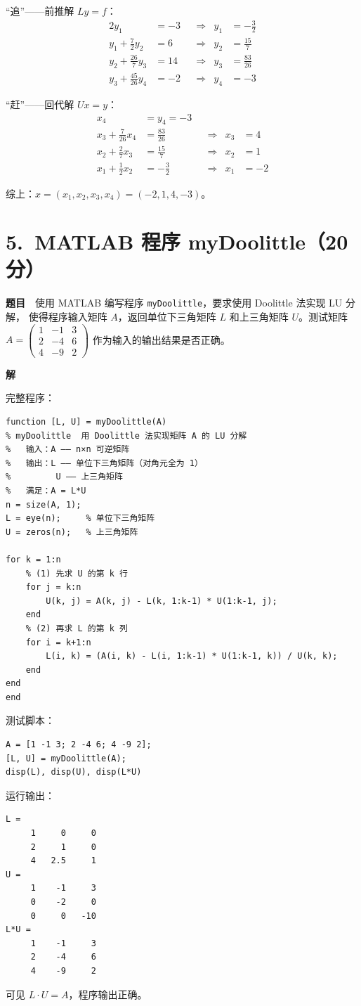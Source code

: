 \documentclass[a4paper,11pt]{ctexart}
\begin{document}
``追''——前推解 $Ly=f$：
\[
  \begin{aligned}
    2y_1&=-3 & &\Rightarrow & y_1&=-\tfrac32\\
    y_1+\tfrac72 y_2&=6 & &\Rightarrow & y_2&=\tfrac{15}{7}\\
    y_2+\tfrac{26}{7}y_3&=14 & &\Rightarrow & y_3&=\tfrac{83}{26}\\
    y_3+\tfrac{45}{26}y_4&=-2 & &\Rightarrow & y_4&=-3
  \end{aligned}
\]

``赶''——回代解 $Ux=y$：
\[
  \begin{aligned}
    x_4&=y_4=-3\\
    x_3+\tfrac{7}{26}x_4&=\tfrac{83}{26} & &\Rightarrow & x_3&=4\\
    x_2+\tfrac27 x_3&=\tfrac{15}{7} & &\Rightarrow & x_2&=1\\
    x_1+\tfrac12 x_2&=-\tfrac32 & &\Rightarrow & x_1&=-2
  \end{aligned}
\]

综上：$x=(x_1,x_2,x_3,x_4)=(-2,1,4,-3)$。

\section*{5.\ MATLAB 程序 myDoolittle（20分）}

\textbf{题目}　使用 MATLAB 编写程序 \texttt{myDoolittle}，要求使用 Doolittle 法实现 LU 分解，
使得程序输入矩阵 $A$，返回单位下三角矩阵 $L$ 和上三角矩阵 $U$。测试矩阵
$A=\begin{pmatrix}1&-1&3\\2&-4&6\\4&-9&2\end{pmatrix}$ 作为输入的输出结果是否正确。

\textbf{解}

完整程序：
\begin{lstlisting}
function [L, U] = myDoolittle(A)
% myDoolittle  用 Doolittle 法实现矩阵 A 的 LU 分解
%   输入：A —— n×n 可逆矩阵
%   输出：L —— 单位下三角矩阵（对角元全为 1）
%         U —— 上三角矩阵
%   满足：A = L*U
n = size(A, 1);
L = eye(n);     % 单位下三角矩阵
U = zeros(n);   % 上三角矩阵

for k = 1:n
    % (1) 先求 U 的第 k 行
    for j = k:n
        U(k, j) = A(k, j) - L(k, 1:k-1) * U(1:k-1, j);
    end
    % (2) 再求 L 的第 k 列
    for i = k+1:n
        L(i, k) = (A(i, k) - L(i, 1:k-1) * U(1:k-1, k)) / U(k, k);
    end
end
end
\end{lstlisting}

测试脚本：
\begin{lstlisting}
A = [1 -1 3; 2 -4 6; 4 -9 2];
[L, U] = myDoolittle(A);
disp(L), disp(U), disp(L*U)
\end{lstlisting}

运行输出：
\begin{lstlisting}
L =
     1     0     0
     2     1     0
     4   2.5     1
U =
     1    -1     3
     0    -2     0
     0     0   -10
L*U =
     1    -1     3
     2    -4     6
     4    -9     2
\end{lstlisting}

可见 $L\cdot U=A$，程序输出正确。
\end{document}
